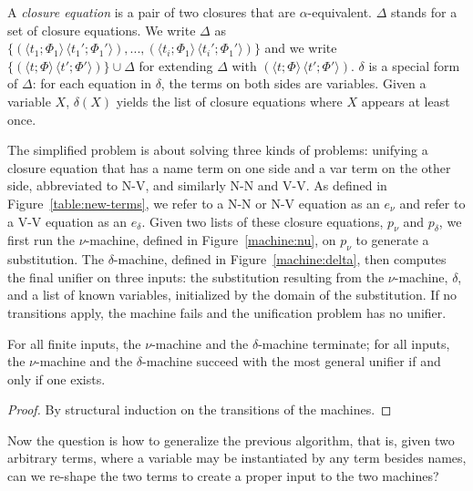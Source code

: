 \documentclass[a4paper,UKenglish]{lipics-v2016}
\newcommand{\clos}[2] {
  \langle #1; #2 \rangle
}
\newcommand{\pr}[2] {
 (#1\, #2)
}
\newcommand*{\transname}[1]{\textsc{#1}}
\begin{document}
  A \emph{closure equation} is a pair of two closures that are
  $\alpha$-equivalent. $\Delta$ stands for a set of closure equations.
  We write $\Delta$ as $\{\pr{\clos{t_1}{\Phi_1}}{\clos{t_1'}{\Phi_1'}},
  ..., \pr{\clos{t_i}{\Phi_1}}{\clos{t_i'}{\Phi_1'}}\}$ and we write
  $\{\pr{\clos{t}{\Phi}}{\clos{t'}{\Phi'}}\}\cup\Delta$ for extending
  $\Delta$ with $\pr{\clos{t}{\Phi}}{\clos{t'}{\Phi'}}$. 
  $\delta$ is a special form of $\Delta$: for each equation in
  $\delta$, the terms on both sides are variables.
  Given a variable $X$, $\delta(X)$ yields the list of
  closure equations where $X$ appears at least once.

  The simplified problem is about solving three kinds of problems:
  unifying a closure equation that has a name term on one side
  and a var term on the other side,
  abbreviated to \transname{N-V},
  and similarly \transname{N-N} and \transname{V-V}.
As defined in Figure~\ref{table:new-terms},
we refer to a \transname{N-N} or \transname{N-V} equation as
an \emph{$e_\nu$} and refer to a
\transname{V-V} equation as an \emph{$e_\delta$}.
Given two lists of these closure equations,
$p_\nu$ and $p_\delta$,
we first run the
$\nu$-machine, defined in Figure~\ref{machine:nu},
on $p_\nu$ to generate a substitution.
The $\delta$-machine, defined in Figure~\ref{machine:delta},
then computes the final unifier on three inputs:
the substitution resulting from the $\nu$-machine,
$\delta$, and a list of known variables, initialized by
the domain of the substitution.
If no transitions apply, the machine
fails and the unification problem has no unifier.


\begin{lemma}\label{lemma:numachine}
 For all finite inputs, the $\nu$-machine and the $\delta$-machine
 terminate; for all inputs, the $\nu$-machine and the $\delta$-machine
 succeed with the most general unifier if and only if one exists.
\end{lemma}
\begin{proof}
    By structural induction on the transitions of the machines.
\end{proof}


Now the question is how to generalize the previous algorithm, that is,
given two arbitrary terms, where a variable may be instantiated by any
term besides names, can we re-shape the two terms to create a proper
input to the two machines?
\end{document}

